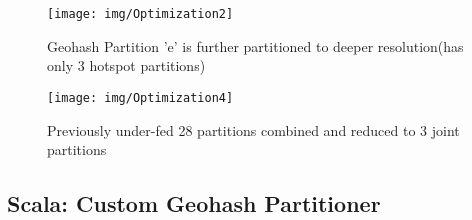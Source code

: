 \documentclass[article,type=msc,colorback,12pt,accentcolor=tud1d]{tudthesis}
\begin{document}
			\clearpage	
						
			\begin{figure}[p]
			\centering
			\texttt{[image: img/Optimization2]}
			\caption{Geohash Partition 'e' is further partitioned to deeper resolution(has only 3 hotspot partitions)}
			\label{fig:Optimization2}
			\end{figure}
						
						
			\begin{figure}[p]
			\centering
			\texttt{[image: img/Optimization4]}
			\caption{Previously under-fed 28 partitions combined and reduced to 3 joint partitions}
			\label{fig:Optimization4}
			\end{figure}
			
			
			\clearpage
			\subsection{Scala: Custom Geohash Partitioner}
\end{document}
